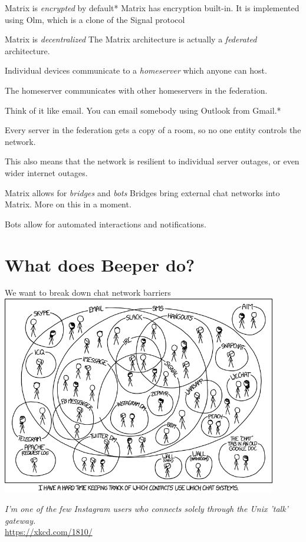 \documentclass{acm}
\begin{document}
\begin{frame}{Matrix is \textit{encrypted} by default*}
    Matrix has encryption built-in. It is implemented using Olm, which is a
    clone of the Signal protocol

\end{frame}

\begin{frame}{Matrix is \textit{decentralized}}
    The Matrix architecture is actually a \textit{federated} architecture.

    Individual devices communicate to a \textit{homeserver} which anyone can
    host.

    The homeserver communicates with other homeservers in the federation.
    \pause

    Think of it like email. You can email somebody using Outlook from Gmail.*
    \pause

    Every server in the federation gets a copy of a room, so no one entity
    controls the network.
    \pause

    This also means that the network is resilient to individual server outages,
    or even wider internet outages.
\end{frame}

\begin{frame}{Matrix allows for \textit{bridges} and \textit{bots}}
    Bridges bring external chat networks into Matrix. More on this in a moment.
    \pause

    Bots allow for automated interactions and notifications.
\end{frame}

\section{What does Beeper do?}

\begin{frame}{We want to break down chat network barriers}
    \centering
    \includegraphics[width=0.9\textwidth]{graphics/chat_systems.png}

    \scriptsize
    \textit{I'm one of the few Instagram users who connects solely through the
    Unix 'talk' gateway.}\\
    \tiny
    \url{https://xkcd.com/1810/}
\end{frame}
\end{document}
